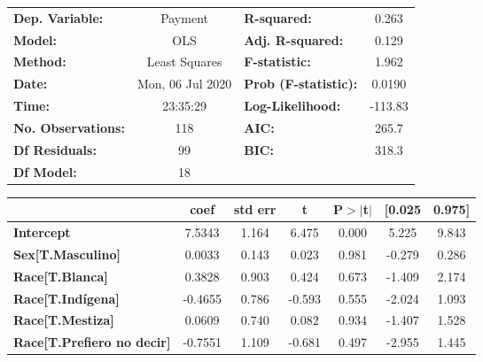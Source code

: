 \documentclass{report}
\begin{document}
\begin{center}
\begin{tabular}{lclc}
\toprule
\textbf{Dep. Variable:}            &     Payment      & \textbf{  R-squared:         } &     0.263   \\
\textbf{Model:}                    &       OLS        & \textbf{  Adj. R-squared:    } &     0.129   \\
\textbf{Method:}                   &  Least Squares   & \textbf{  F-statistic:       } &     1.962   \\
\textbf{Date:}                     & Mon, 06 Jul 2020 & \textbf{  Prob (F-statistic):} &   0.0190    \\
\textbf{Time:}                     &     23:35:29     & \textbf{  Log-Likelihood:    } &   -113.83   \\
\textbf{No. Observations:}         &         118      & \textbf{  AIC:               } &     265.7   \\
\textbf{Df Residuals:}             &          99      & \textbf{  BIC:               } &     318.3   \\
\textbf{Df Model:}                 &          18      & \textbf{                     } &             \\
\bottomrule
\end{tabular}
\begin{tabular}{lcccccc}
                                   & \textbf{coef} & \textbf{std err} & \textbf{t} & \textbf{P$> |$t$|$} & \textbf{[0.025} & \textbf{0.975]}  \\
\midrule
\textbf{Intercept}                 &       7.5343  &        1.164     &     6.475  &         0.000        &        5.225    &        9.843     \\
\textbf{Sex[T.Masculino]}          &       0.0033  &        0.143     &     0.023  &         0.981        &       -0.279    &        0.286     \\
\textbf{Race[T.Blanca]}            &       0.3828  &        0.903     &     0.424  &         0.673        &       -1.409    &        2.174     \\
\textbf{Race[T.Indígena]}          &      -0.4655  &        0.786     &    -0.593  &         0.555        &       -2.024    &        1.093     \\
\textbf{Race[T.Mestiza]}           &       0.0609  &        0.740     &     0.082  &         0.934        &       -1.407    &        1.528     \\
\textbf{Race[T.Prefiero no decir]} &      -0.7551  &        1.109     &    -0.681  &         0.497        &       -2.955    &        1.445     \\

\end{tabular}
\end{center}
\end{document}
